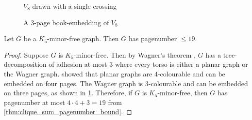 \begin{figure}[h!]
	\centering
	\begin{minipage}{0.5\textwidth}
		\centering
		
		\caption{$V_8$ drawn with a single crossing}\label{fig:wagner_single_crossing}
	\end{minipage}%
	\begin{minipage}{0.5\textwidth}
		\centering
		
		\caption[V8 book embedding]{A 3-page book-embedding of $V_8$}\label{fig:wagner_bookembedding}
	\end{minipage}
\end{figure}

\begin{theorem}
	Let \(G\) be a \(K_5\)-minor-free graph. Then \(G\) has pagenumber \(\leq 19\).
\end{theorem}

\begin{proof}
	Suppose \(G\) is \(K_5\)-minor-free. Then by Wagner's theorem \cite{wagnerUeberEigenschaftEbenen1937}, \(G\) has a tree-decomposition of adhesion at most 3 where every torso is either a planar graph or the Wagner graph.
	\textcite{yannakakisEmbeddingPlanarGraphs1989} showed that planar graphs are \(4\)-colourable and can be embedded on four pages. The Wagner graph is \(3\)-colourable and can be embedded on three pages, as shown in \cref{fig:wagner_bookembedding}. Therefore, if \(G\) is \(K_5\)-minor-free, then \(G\) has pagenumber at most \(4 \cdot 4 + 3 = 19\) from \cref{thm:clique_sum_pagenumber_bound}.
\end{proof}
